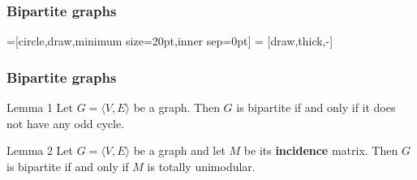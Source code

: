 



%

\begin{frame}[fragile]
\frametitle{Bipartite graphs}

=[circle,draw,minimum size=20pt,inner sep=0pt]
 = [draw,thick,-]
\begin{figure}
\end{figure}
\end{frame}

\begin{frame}[fragile]
\frametitle{Bipartite graphs}
\begin{block}{Lemma 1}
Let \(G=\langle V,E\rangle\) be a graph.
Then \(G\) is bipartite if and only if it does not have any odd cycle.
\end{block}

\begin{block}{Lemma 2}
Let \(G=\langle V,E\rangle\) be a graph and let \(M\) be its \textbf{incidence} matrix.
Then \(G\) is bipartite if and only if \(M\) is totally unimodular.
\end{block}
\end{frame}


